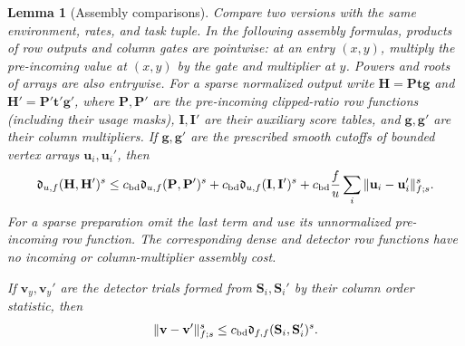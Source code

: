 \documentclass[11pt]{article}
\numberwithin{equation}{section}
\newtheorem{lemma}[theorem]{Lemma}
\theoremstyle{definition}
\theoremstyle{remark}
\begin{document}
\begin{lemma}[Assembly comparisons]
\label{lem:atom-assembly}
Compare two versions with the same environment, rates, and task tuple.
In the following assembly formulas, products of row outputs and column gates are pointwise: at an entry $(x,y)$, multiply the pre-incoming value at $(x,y)$ by the gate and multiplier at $y$. Powers and roots of arrays are also entrywise. For a sparse normalized output write ${\mathbf{H}}={\mathbf{P}} {\mathbf{t}} {\mathbf{g}}$ and
${\mathbf{H}}'={\mathbf{P}}'{\mathbf{t}}'{\mathbf{g}}'$, where ${\mathbf{P}},{\mathbf{P}}'$ are the pre-incoming clipped-ratio row
functions (including their usage masks), ${\mathbf{I}},{\mathbf{I}}'$ are their auxiliary
score tables, and ${\mathbf{g}},{\mathbf{g}}'$ are their column multipliers.  If ${\mathbf{g}},{\mathbf{g}}'$ are the
prescribed smooth cutoffs of bounded vertex arrays ${\mathbf{u}}_i,{\mathbf{u}}_i'$, then
\begin{equation}
 \mathfrak d_{u,f}({\mathbf{H}},{\mathbf{H}}')^s
 \le {c_{\rm bd}}\mathfrak d_{u,f}({\mathbf{P}},{\mathbf{P}}')^s
    +{c_{\rm bd}}\mathfrak d_{u,f}({\mathbf{I}},{\mathbf{I}}')^s
    +{c_{\rm bd}}\frac fu\sum_i\|{\mathbf{u}}_i-{\mathbf{u}}_i'\|_{f;s}^s.
 \label{eq:atom-assembly-bound}
\end{equation}
For a sparse preparation omit the last term and use its unnormalized
pre-incoming row function.  The corresponding dense and detector row
functions have no incoming or column-multiplier assembly cost.

If ${\mathbf{v}}_y,{\mathbf{v}}_y'$ are the detector trials formed from
${\mathbf{S}}_i,{\mathbf{S}}_i'$ by their column order statistic, then
\begin{equation}
 \|{\mathbf{v}}-{\mathbf{v}}'\|_{f;s}^s
   \le {c_{\rm bd}}\mathfrak d_{f,f}({\mathbf{S}}_i,{\mathbf{S}}_i')^s.
 \label{eq:atom-detector-comparison}
\end{equation}
\end{lemma}
\end{document}
